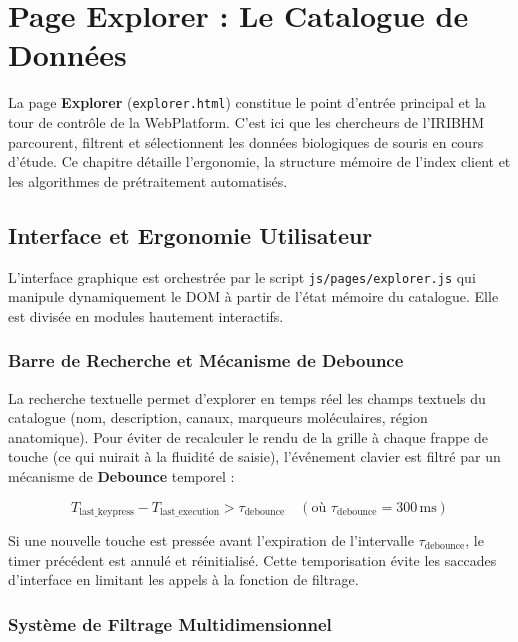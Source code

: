 \chapter{Page Explorer : Le Catalogue de Données}
\label{chap:explorer}

La page \textbf{Explorer} (\texttt{explorer.html}) constitue le point d'entrée principal et la tour de contrôle de la WebPlatform. C'est ici que les chercheurs de l'IRIBHM parcourent, filtrent et sélectionnent les données biologiques de souris en cours d'étude. Ce chapitre détaille l'ergonomie, la structure mémoire de l'index client et les algorithmes de prétraitement automatisés.

\section{Interface et Ergonomie Utilisateur}

L'interface graphique est orchestrée par le script \texttt{js/pages/explorer.js} qui manipule dynamiquement le DOM à partir de l'état mémoire du catalogue. Elle est divisée en modules hautement interactifs.

\subsection{Barre de Recherche et Mécanisme de Debounce}

La recherche textuelle permet d'explorer en temps réel les champs textuels du catalogue (nom, description, canaux, marqueurs moléculaires, région anatomique). Pour éviter de recalculer le rendu de la grille à chaque frappe de touche (ce qui nuirait à la fluidité de saisie), l'événement clavier est filtré par un mécanisme de \textbf{Debounce} temporel :

\begin{equation}
    T_{\text{last\_keypress}} - T_{\text{last\_execution}} > \tau_{\text{debounce}} \quad (\text{où } \tau_{\text{debounce}} = 300\,\text{ms})
\end{equation}

Si une nouvelle touche est pressée avant l'expiration de l'intervalle $\tau_{\text{debounce}}$, le timer précédent est annulé et réinitialisé. Cette temporisation évite les saccades d'interface en limitant les appels à la fonction de filtrage.

\subsection{Système de Filtrage Multidimensionnel}

